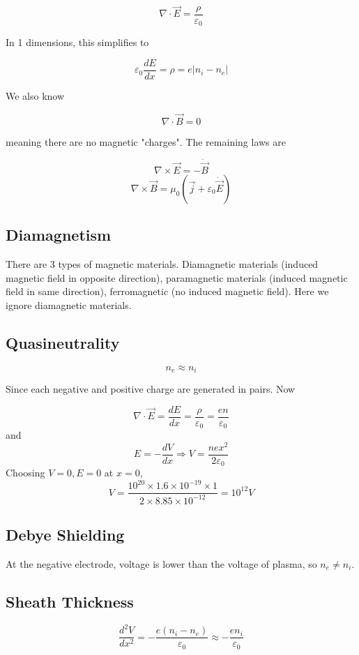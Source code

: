 \documentclass[12pt]{article}
\begin{document}
$$\nabla \cdot \vec E = \frac{\rho}{\varepsilon_0}$$

In 1 dimensions, this simplifies to

$$\varepsilon_0 \frac{dE}{dx} = \rho = e|n_i - n_e|$$

We also know

$$\nabla \cdot \vec B = 0$$

meaning there are no magnetic "charges". The remaining laws are

$$\nabla \times \vec E = -\dot{\vec B}$$
$$\nabla \times \vec B = \mu_0\left(\vec j + \varepsilon_0\dot{\vec E}\right)$$

\subsection{Diamagnetism}

There are 3 types of magnetic materials. Diamagnetic materials (induced magnetic field in opposite direction), paramagnetic materials (induced magnetic field in same direction), ferromagnetic (no induced magnetic field). Here we ignore diamagnetic materials.

\subsection{Quasineutrality}

$$n_e \approx n_i$$

Since each negative and positive charge are generated in pairs. Now

$$\nabla \cdot \vec E = \frac{dE}{dx} = \frac{\rho}{\varepsilon_0} = \frac{en}{\varepsilon_0}$$
and
$$E = -\frac{dV}{dx} \Rightarrow V = \frac{nex^2}{2\varepsilon_0}$$
Choosing $V=0,E=0$ at $x=0$,
$$V = \frac{10^{20} \times 1.6 \times 10^{-19} \times 1}{2 \times 8.85 \times 10^{-12}} = 10^{12}\unit{V}$$

\subsection{Debye Shielding}

At the negative electrode, voltage is lower than the voltage of plasma, so $n_e \neq n_i$.

\subsection{Sheath Thickness}

$$\frac{d^2V}{dx^2} = -\frac{e(n_i-n_e)}{\varepsilon_0} \approx -\frac{en_i}{\varepsilon_0}$$
\end{document}
